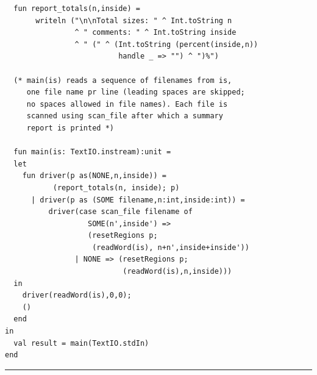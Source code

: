 \documentclass[12pt]{book}
\begin{document}
\begin{verbatim}
  fun report_totals(n,inside) = 
       writeln ("\n\nTotal sizes: " ^ Int.toString n
                ^ " comments: " ^ Int.toString inside
                ^ " (" ^ (Int.toString (percent(inside,n)) 
                          handle _ => "") ^ ")%")

  (* main(is) reads a sequence of filenames from is,
     one file name pr line (leading spaces are skipped;
     no spaces allowed in file names). Each file is 
     scanned using scan_file after which a summary
     report is printed *)

  fun main(is: TextIO.instream):unit =
  let 
    fun driver(p as(NONE,n,inside)) = 
           (report_totals(n, inside); p)
      | driver(p as (SOME filename,n:int,inside:int)) =
          driver(case scan_file filename of
                   SOME(n',inside') =>
                   (resetRegions p;
                    (readWord(is), n+n',inside+inside'))
                | NONE => (resetRegions p;
                           (readWord(is),n,inside)))
  in
    driver(readWord(is),0,0);
    ()
  end
in 
  val result = main(TextIO.stdIn)
end
\end{verbatim}
\hrule
\bigskip
\end{document}

